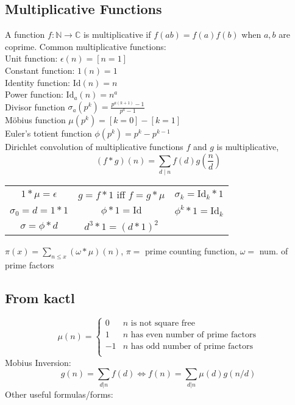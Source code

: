 \subsection{Multiplicative Functions}
A function $f : \mathbb{N} \to \mathbb{C}$ is multiplicative if
$f(ab) = f(a)f(b)$ when $a, b$ are coprime.
Common multiplicative functions: \\
Unit function: $\epsilon(n) = [n = 1]$ \\
Constant function: $1(n) = 1$ \\ 
Identity function: $\mathrm{Id}(n) = n$ \\
Power function: $\mathrm{Id}_a(n) = n^a$ \\
Divisor function $\sigma_a(p^k) = \frac{p^{a(k+1)} - 1}{p^a - 1}$ \\
Möbius function $\mu(p^k) = [k = 0] - [k = 1]$ \\
Euler's totient function $\phi(p^k) = p^k - p^{k-1}$ \\
Dirichlet convolution of multiplicative functions $f$ and $g$ is multiplicative,
\[ (f*g)(n) = \sum_{d \mid n} f(d) g\left(\frac{n}{d}\right) \]
\begin{center}
    \begin{tabular}{ c c c }
        $1 * \mu = \epsilon$ & $g = f * 1$ iff $f = g * \mu$ & $\sigma_k = \mathrm{Id}_k * 1$ \\
        $\sigma_0 = d = 1 * 1$ & $\phi * 1 = \mathrm{Id}$ & $\phi^k * 1 = \mathrm{Id}_k$ \\
        $\sigma = \phi * d$ & $d^3 * 1 = (d * 1)^2$ & 
    \end{tabular}
\end{center}
$\pi(x) = \sum_{n \leq x} (\omega * \mu)(n)$, $\pi = $ prime counting function, $\omega = $ num. of prime factors \\

\subsection{From kactl}
\[
	\mu(n) = \begin{cases} 0 & n \textrm{ is not square free}\\ 1 & n \textrm{ has even number of prime factors}\\ -1 & n \textrm{ has odd number of prime factors}\\\end{cases}
\]
  Mobius Inversion:
  \[ g(n) = \sum_{d|n} f(d) \Leftrightarrow f(n) = \sum_{d|n} \mu(d)g(n/d) \]
  Other useful formulas/forms:

